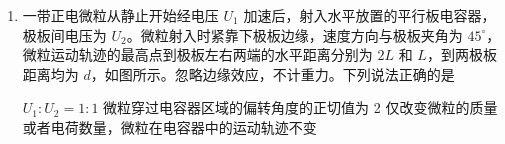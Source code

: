 \documentclass[\gkver]{gaokaozhenti}
\begin{document}
\begin{enumerate}
{$mg = f$，$f = \mu F_{N}$，$F_{N} = k\left(l - \frac{l}{2}\right)$

联立解得 $k = \frac{4\Umg}{l}$

A 正确；

C．在 PM 之间任取一点 A，令 AO 与 MN 之间的夹角为 $\theta$，则此时弹簧的弹力为

$F = k\left(l - \frac{l}{2\sin\theta}\right)$

小球受到的摩擦力为 $f_{1} = \mu F_{N1} = \mu F \sin \theta$

化简得 $f_{1} = \mu \left( kl \sin \theta - \frac{kl}{2} \right)$

$\theta$ 在 MP 之间增大在 PN 之间变小，即摩擦力先变大后变小，C 错误；

D．根据对称性可知在任意关于 P 点对称的点摩擦力大小相等，因此由对称性可知 M 到 P 和 P 到 N 摩擦力做功大小相等；D 正确；

B．小球运动到 P 点下方 $\frac{1}{2}l$ 时 $\theta = 45^\circ$，此时摩擦力大小为

$f_{1} = \mu \left( kl \frac{\sqrt{2}}{2} - \frac{kl}{2} \right)$

由牛顿第二定律 $mg - f = ma$

联立解得 $a = \left(2 - \sqrt{2}\right)g$

B 错误。

故选 AD。
}

\item
一带正电微粒从静止开始经电压 $U_{1}$ 加速后，射入水平放置的平行板电容器，极板间电压为 $U_{2}$。微粒射入时紧靠下极板边缘，速度方向与极板夹角为 $45^\circ$，微粒运动轨迹的最高点到极板左右两端的水平距离分别为 $2L$ 和 $L$，到两极板距离均为 $d$，如图所示。忽略边缘效应，不计重力。下列说法正确的是 


{$U_{1}:U_{2}=1:1$}
{微粒穿过电容器区域的偏转角度的正切值为 2}
{仅改变微粒的质量或者电荷数量，微粒在电容器中的运动轨迹不变}

\end{enumerate}
\end{document}
